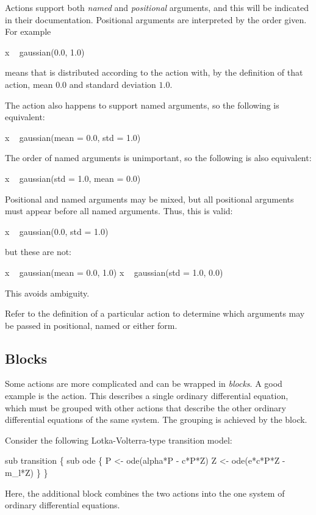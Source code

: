 Actions support both \emph{named} and \emph{positional}
arguments, and this will be indicated in their
documentation. Positional arguments are interpreted by the order given. For
example
\begin{bicode}
x ~ gaussian(0.0, 1.0)
\end{bicode}
means that  is distributed according to the 
action with, by the definition of that action, mean $0.0$ and standard
deviation $1.0$.

The  action also happens to support named arguments, so
the following is equivalent:
\begin{bicode}
x ~ gaussian(mean = 0.0, std = 1.0)
\end{bicode}
The order of named arguments is unimportant, so the following is also
equivalent:
\begin{bicode}
x ~ gaussian(std = 1.0, mean = 0.0)
\end{bicode}

Positional and named arguments may be mixed, but all positional arguments must
appear before all named arguments. Thus, this is valid:
\begin{bicode}
x ~ gaussian(0.0, std = 1.0)
\end{bicode}
but these are not:
\begin{bicode}
x ~ gaussian(mean = 0.0, 1.0)
x ~ gaussian(std = 1.0, 0.0)
\end{bicode}
This avoids ambiguity.

Refer to the definition of a particular action to determine which arguments
may be passed in positional, named or either form.

\subsection{Blocks}

Some actions are more complicated and can be wrapped in \emph{blocks}. A
good example is the  action. This describes a single ordinary
differential equation, which must be
grouped with other actions that describe the other ordinary differential
equations of the same system. The grouping is achieved by the 
block.

Consider the following Lotka-Volterra-type transition
model:
\begin{bicode}
sub transition \{
  sub ode \{
    P <- ode(alpha*P - c*P*Z)
    Z <- ode(e*c*P*Z - m_l*Z)
  \}
\}
\end{bicode}
Here, the additional  block combines the two actions into the
one system of ordinary differential equations.

